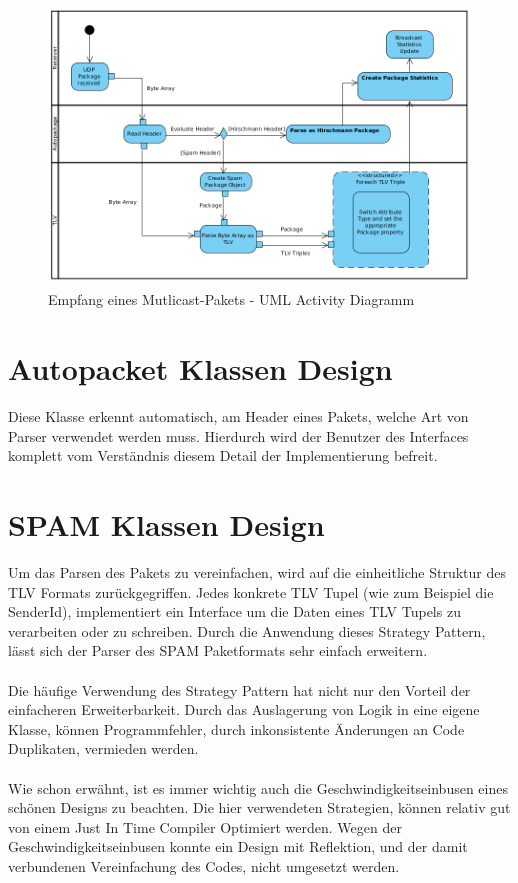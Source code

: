 \begin{figure}[H]
\includegraphics[width=15cm]{images/Receive.png}
\centering
\caption{Empfang eines Mutlicast-Pakets - UML Activity Diagramm}
\label{fig_receive}
\end{figure}


\section{Autopacket Klassen Design}

Diese Klasse erkennt automatisch, am Header eines Pakets, welche Art von Parser 
verwendet werden muss. Hierdurch wird der Benutzer des Interfaces komplett 
vom Verständnis diesem Detail der Implementierung befreit.

\section{SPAM Klassen Design}
\label{sec:7:packet}

Um das Parsen des Pakets zu vereinfachen, wird auf die einheitliche Struktur des TLV Formats zurückgegriffen.
Jedes konkrete TLV Tupel (wie zum Beispiel die SenderId), implementiert ein Interface um die Daten eines TLV
Tupels zu verarbeiten oder zu schreiben. Durch die Anwendung dieses Strategy Pattern, lässt sich der
Parser des SPAM Paketformats sehr einfach erweitern.
\\
\\
Die häufige Verwendung des Strategy Pattern hat nicht nur den Vorteil der einfacheren Erweiterbarkeit. Durch das Auslagerung von Logik in eine eigene Klasse, können Programmfehler, durch inkonsistente Änderungen an Code Duplikaten, vermieden werden. 
\\
\\
Wie schon erwähnt, ist es immer wichtig auch die Geschwindigkeitseinbusen eines schönen Designs zu beachten.
Die hier verwendeten Strategien, können relativ gut von einem Just In Time Compiler Optimiert werden.
Wegen der Geschwindigkeitseinbusen konnte ein Design mit Reflektion, und der damit
verbundenen Vereinfachung des Codes, nicht umgesetzt werden.

